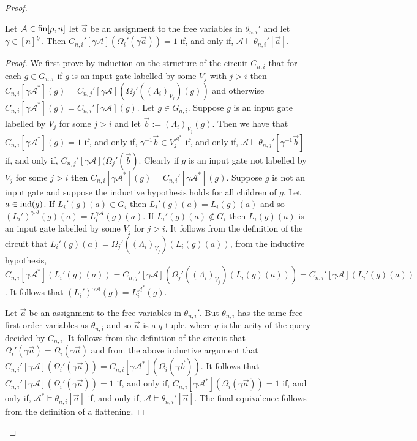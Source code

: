 \documentclass[../main/thesis.tex]{subfiles}
\begin{document}
\begin{proof}
\begin{claim}
  Let $\mathcal{A} \in \text{\upshape fin}[\rho, n]$ let $\vec{a}$ be an assignment to the free
  variables in $\theta_{n,i}'$ and let $\gamma \in [n]^{\underline{U}}$. Then
  $C_{n, i}'[\gamma \mathcal{A}](\Omega_i' (\gamma \vec{a})) = 1$ if, and only
  if, $\mathcal{A} \models \theta_{n, i}' [\vec{a}]$.
\end{claim}
\begin{proof}
  We first prove by induction on the structure of the circuit $C_{n, i}$ that
  for each $g \in G_{n, i}$ if $g$ is an input gate labelled by some $V_j$ with
  $j > i$ then $C_{n, i}[\gamma \mathcal{A}^*](g) = C_{n, j}'[\gamma
  \mathcal{A}](\Omega_j'((\Lambda_i)_{V_j})(g))$ and otherwise $C_{n, i}[\gamma
  \mathcal{A}^*](g) = C_{n, i}'[\gamma \mathcal{A}](g)$. Let $g \in G_{n, i}$.
  Suppose $g$ is an input gate labelled by $V_j$ for some $j > i$ and let
  $\vec{b} := (\Lambda_i)_{V_j}(g)$. Then we have that $C_{n, i}[\gamma
  \mathcal{A}^*](g) = 1$ if, and only if, $\gamma^{-1} \vec{b} \in
  V^{\mathcal{A}^*}_j$ if, and only if, $\mathcal{A} \models \theta_{n,
    j}'[\gamma^{-1} \vec{b}]$ if, and only if, $C_{n, j}'[\gamma
  \mathcal{A}](\Omega_j'(\vec{b})$. Clearly if $g$ is an input gate not labelled
  by $V_j$ for some $j > i$ then $C_{n, i}[\gamma \mathcal{A}^*](g) = C_{n, i}'
  [\gamma \mathcal{A}^*](g)$. Suppose $g$ is not an input gate and suppose the
  inductive hypothesis holds for all children of $g$. Let $a \in \text{\upshape ind}(g)$. If
  $L_i'(g)(a) \in G_i$ then $L_i' (g) (a) = L_i (g)(a)$ and so $(L_i')^{\gamma
    \mathcal{A}}(g)(a) = L^{\gamma \mathcal{A}}_i(g)(a)$. If $L_i'(g)(a) \not\in
  G_i$ then $L_i(g)(a)$ is an input gate labelled by some $V_j$ for $j > i$. It
  follows from the definition of the circuit that $L_i'(g)(a) =
  \Omega_j'((\Lambda_i)_{V_j})(L_i(g)(a))$, from the inductive hypothesis,
  $C_{n, i}[\gamma \mathcal{A}^*](L_i'(g)(a)) = C_{n, j}'[\gamma
  \mathcal{A}](\Omega_j'((\Lambda_i)_{V_j})(L_i(g)(a))) = C_{n, i}'[\gamma
  \mathcal{A}](L_i'(g)(a))$. It follows that $(L_i')^{\gamma \mathcal{A}}(g) =
  L^{\mathcal{A}^*}_i(g)$.

  Let $\vec{a}$ be an assignment to the free variables in $\theta_{n, i}'$. But
  $\theta_{n, i}$ has the same free first-order variables as $\theta_{n, i}$ and
  so $\vec{a}$ is a $q$-tuple, where $q$ is the arity of the query decided by
  $C_{n, i}$. It follows from the definition of the circuit that
  $\Omega_i'(\gamma \vec{a}) = \Omega_i(\gamma \vec{a})$ and from the above
  inductive argument that $C_{n, i}'[\gamma \mathcal{A}](\Omega_i'(\gamma
  \vec{a})) = C_{n, i} [\gamma \mathcal{A}^*] (\Omega_i(\gamma \vec{b}))$. It
  follows that $C_{n, i}' [\gamma \mathcal{A}](\Omega_i' (\gamma \vec{a})) = 1$
  if, and only if, $C_{n, i} [\gamma \mathcal{A}^*] (\Omega_i(\gamma \vec{a})) =
  1$ if, and only if, $\mathcal{A}^* \models \theta_{n, i} [\vec{a}]$ if, and
  only if, $\mathcal{A} \models \theta_{n, i}'[\vec{a}]$. The final equivalence
  follows from the definition of a flattening.



\end{proof}
\end{proof}
\end{document}
